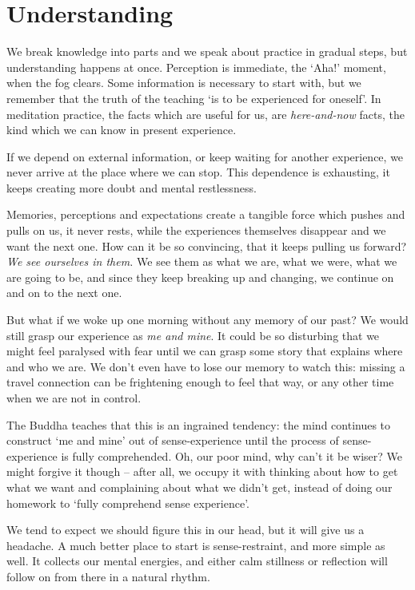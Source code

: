 \hypertarget{understanding-1}{%
\chapter{Understanding}\label{understanding-1}}

We break knowledge into parts and we speak about practice in gradual
steps, but understanding happens at once. Perception is immediate, the
`Aha!' moment, when the fog clears. Some information is necessary to
start with, but we remember that the truth of the teaching `is to be
experienced for oneself'. In meditation practice, the facts which are
useful for us, are \emph{here-and-now} facts, the kind which we can know
in present experience.

If we depend on external information, or keep waiting for another
experience, we never arrive at the place where we can stop. This
dependence is exhausting, it keeps creating more doubt and mental
restlessness.

Memories, perceptions and expectations create a tangible force which
pushes and pulls on us, it never rests, while the experiences themselves
disappear and we want the next one. How can it be so convincing, that it
keeps pulling us forward? \emph{We see ourselves in them.} We see them
as what we are, what we were, what we are going to be, and since they
keep breaking up and changing, we continue on and on to the next one.

But what if we woke up one morning without any memory of our past? We
would still grasp our experience as \emph{me and mine}. It could be so
disturbing that we might feel paralysed with fear until we can grasp
some story that explains where and who we are. We don't even have to
lose our memory to watch this: missing a travel connection can be
frightening enough to feel that way, or any other time when we are not
in control.

The Buddha teaches that this is an ingrained tendency: the mind
continues to construct `me and mine' out of sense-experience until the
process of sense-experience is fully comprehended. Oh, our poor mind,
why can't it be wiser? We might forgive it though -- after all, we
occupy it with thinking about how to get what we want and complaining
about what we didn't get, instead of doing our homework to `fully
comprehend sense experience'.

We tend to expect we should figure this in our head, but it will give us
a headache. A much better place to start is sense-restraint, and more
simple as well. It collects our mental energies, and either calm
stillness or reflection will follow on from there in a natural rhythm.

